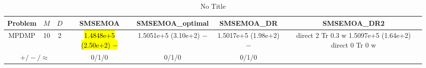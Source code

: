 \documentclass[journal]{IEEEtran}
\newcommand{\semitextbf}[1]{%
\pdfliteral direct {2 Tr 0.3 w} %
#1%
\pdfliteral direct {0 Tr 0 w}%
}
\begin{document}
\begin{table*}[htbp]
\renewcommand{\arraystretch}{1.2}
\centering
\caption{No Title}
\begin{tabular}{ccccccc}
\toprule
Problem&$M$&$D$&SMSEMOA&SMSEMOA\_optimal&SMSEMOA\_DR&SMSEMOA\_DR2\\
\midrule
\multirow{1}{*}{MPDMP}&10&2&\hl{1.4848e+5 (2.50e+2) $-$}&1.5051e+5 (3.10e+2) $-$&1.5017e+5 (1.98e+2) $-$&\semitextbf{1.5097e+5 (1.64e+2)}\\
\hline
\multicolumn{3}{c}{$+/-/\approx$}&0/1/0&0/1/0&0/1/0&\\
\bottomrule
\end{tabular}
\label{No Label}
\end{table*}
\end{document}
